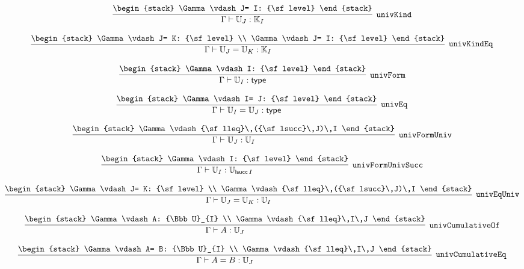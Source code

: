 \[
\infer[{\tt univKind}]{\Gamma \vdash {\Bbb U}_{J}: {\Bbb K}_{I}}{
\begin{stack}
\Gamma \vdash J= I: {\sf level}
\end{stack}}
\]

\[
\infer[{\tt univKindEq}]{\Gamma \vdash {\Bbb U}_{J}= {\Bbb U}_{K}: {\Bbb K}_{I}}{
\begin{stack}
\Gamma \vdash J= K: {\sf level}
\\
\Gamma \vdash J= I: {\sf level}
\end{stack}}
\]

\[
\infer[{\tt univForm}]{\Gamma \vdash {\Bbb U}_{I}: {\sf type}}{
\begin{stack}
\Gamma \vdash I: {\sf level}
\end{stack}}
\]

\[
\infer[{\tt univEq}]{\Gamma \vdash {\Bbb U}_{I}= {\Bbb U}_{J}: {\sf type}}{
\begin{stack}
\Gamma \vdash I= J: {\sf level}
\end{stack}}
\]

\[
\infer[{\tt univFormUniv}]{\Gamma \vdash {\Bbb U}_{J}: {\Bbb U}_{I}}{
\begin{stack}
\Gamma \vdash {\sf lleq}\,({\sf lsucc}\,J)\,I
\end{stack}}
\]

\[
\infer[{\tt univFormUnivSucc}]{\Gamma \vdash {\Bbb U}_{I}: {\Bbb U}_{{\sf lsucc}\,I}}{
\begin{stack}
\Gamma \vdash I: {\sf level}
\end{stack}}
\]

\[
\infer[{\tt univEqUniv}]{\Gamma \vdash {\Bbb U}_{J}= {\Bbb U}_{K}: {\Bbb U}_{I}}{
\begin{stack}
\Gamma \vdash J= K: {\sf level}
\\
\Gamma \vdash {\sf lleq}\,({\sf lsucc}\,J)\,I
\end{stack}}
\]

\[
\infer[{\tt univCumulativeOf}]{\Gamma \vdash A: {\Bbb U}_{J}}{
\begin{stack}
\Gamma \vdash A: {\Bbb U}_{I}
\\
\Gamma \vdash {\sf lleq}\,I\,J
\end{stack}}
\]

\[
\infer[{\tt univCumulativeEq}]{\Gamma \vdash A= B: {\Bbb U}_{J}}{
\begin{stack}
\Gamma \vdash A= B: {\Bbb U}_{I}
\\
\Gamma \vdash {\sf lleq}\,I\,J
\end{stack}}
\]

